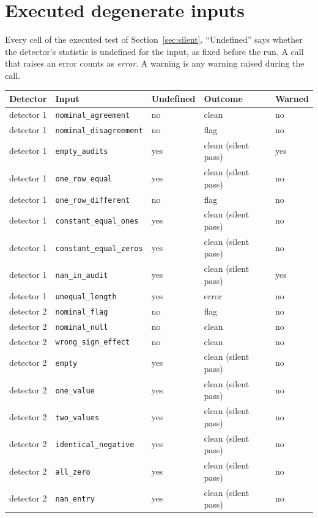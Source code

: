 \documentclass[10pt]{article}
\theoremstyle{definition}
\begin{document}
\section{Executed degenerate inputs}
\label{apd:e17}
Every cell of the executed test of Section~\ref{sec:silent}. ``Undefined'' says whether the detector's statistic is undefined for the input, as fixed before the run. A call that raises an error counts as \emph{error}. A warning is any warning raised during the call.
\begin{longtable}{@{}p{2.1cm}p{5.4cm}p{1.5cm}p{3.1cm}p{1.2cm}@{}}
\toprule
Detector & Input & Undefined & Outcome & Warned\\
\midrule
\endhead
detector 1 & \texttt{nominal\_agreement} & no & clean & no\\
detector 1 & \texttt{nominal\_disagreement} & no & flag & no\\
detector 1 & \texttt{empty\_audits} & yes & clean (silent pass) & yes\\
detector 1 & \texttt{one\_row\_equal} & yes & clean (silent pass) & no\\
detector 1 & \texttt{one\_row\_different} & no & flag & no\\
detector 1 & \texttt{constant\_equal\_ones} & yes & clean (silent pass) & no\\
detector 1 & \texttt{constant\_equal\_zeros} & yes & clean (silent pass) & no\\
detector 1 & \texttt{nan\_in\_audit} & yes & clean (silent pass) & yes\\
detector 1 & \texttt{unequal\_length} & yes & error & no\\
detector 2 & \texttt{nominal\_flag} & no & flag & no\\
detector 2 & \texttt{nominal\_null} & no & clean & no\\
detector 2 & \texttt{wrong\_sign\_effect} & no & clean & no\\
detector 2 & \texttt{empty} & yes & clean (silent pass) & no\\
detector 2 & \texttt{one\_value} & yes & clean (silent pass) & no\\
detector 2 & \texttt{two\_values} & yes & clean (silent pass) & no\\
detector 2 & \texttt{identical\_negative} & yes & clean (silent pass) & no\\
detector 2 & \texttt{all\_zero} & yes & clean (silent pass) & no\\
detector 2 & \texttt{nan\_entry} & yes & clean (silent pass) & no\\

\end{longtable}
\end{document}
